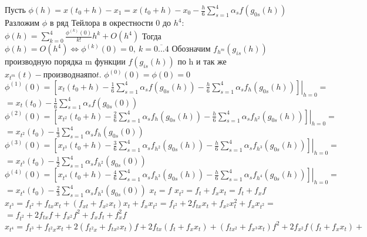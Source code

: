 \documentclass[a4paper,14pt]{article}
\begin{document}
Пусть $\phi(h)=x(t_0+h)-x_{1}=x(t_0+h)-x_0-\frac{h}{6}\sum\limits_{s=1}^{4}\alpha_sf(g_{0s}(h))$\newline
Разложим $\phi$ в ряд Тейлора в окрестности 0 до $h^4$:\newline
$\phi(h)=\sum\limits_{k=0}^{4}\frac{\phi^{(k)}(0)}{k!}h^k+O(h^4)$\newline
Тогда $\phi(h)=O(h^4) \Leftrightarrow \phi^{(k)}(0)=0,\ k=\overline{0...4}$\newline
Обозначим $f_{h^m}(g_{is}(h))$ производную порядка m функции $f(g_{is}(h))$ по h и так же $x_{t^m}(t) - производная по t$.\newline
$\phi^{(0)}(0)=\phi(0)=0$\newline
$\phi^{(1)}(0)=\left.\left[x_t(t_0+h)-\frac{1}{6}\sum\limits_{s=1}^{4}\alpha_sf(g_{0s}(h))-\frac{h}{6}\sum\limits_{s=1}^{4}\alpha_sf_h(g_{0s}(h))\right]\right|_{h=0}=$\newline
$=x_t(t_0)-\frac{1}{6}\sum\limits_{s=1}^{4}\alpha_sf(g_{0s}(0))$\newline
$\phi^{(2)}(0)=\left.\left[x_{t^2}(t_0+h)-\frac{2}{6}\sum\limits_{s=1}^{4}\alpha_sf_{h}(g_{0s}(h))-\frac{h}{6}\sum\limits_{s=1}^{4}\alpha_sf_{h^2}(g_{0s}(h))\right]\right|_{h=0}=$\newline
$=x_{t^2}(t_0)-\frac{1}{3}\sum\limits_{s=1}^{4}\alpha_sf_h(g_{0s}(0))$\newline
$\phi^{(3)}(0)=\left.\left[x_{t^3}(t_0+h)-\frac{3}{6}\sum\limits_{s=1}^{4}\alpha_sf_{h^2}(g_{0s}(h))-\frac{h}{6}\sum\limits_{s=1}^{4}\alpha_sf_{h^3}(g_{0s}(h))\right]\right|_{h=0}=$\newline
$=x_{t^3}(t_0)-\frac{1}{2}\sum\limits_{s=1}^{4}\alpha_sf_{h^2}(g_{0s}(0))$\newline
$\phi^{(4)}(0)=\left.\left[x_{t^4}(t_0+h)-\frac{4}{6}\sum\limits_{s=1}^{4}\alpha_sf_{h^3}(g_{0s}(h))-\frac{h}{6}\sum\limits_{s=1}^{4}\alpha_sf_{h^4}(g_{0s}(h))\right]\right|_{h=0}=$\newline
$=x_{t^4}(t_0)-\frac{2}{3}\sum\limits_{s=1}^{4}\alpha_sf_{h^3}(g_{0s}(0))$\newline
$x_t=f$\newline
$x_{t^2}=f_t+f_xx_t=f_t+f_xf$\newline
$x_{t^3}=f_{t^2}+f_{tx}x_t+(f_{xt}+f_{x^2}x_t)x_t+f_xx_{t^2}=f_{t^2}+2f_{tx}x_t+f_{x^2}x_t^2+f_xx_{t^2}=$\newline
$=f_{t^2}+2f_{tx}f+f_{x^2}f^2+f_xf_t+f_x^2f$\newline
$x_{t^4}=f_{t^3}+f_{t^2x}x_t+2(f_{t^2x}+f_{tx^2}x_t)f+2f_{tx}(f_t+f_xx_t)+(f_{tx^2}+f_{x^3}x_t)f^2+2f_{x^2}f(f_t+f_xx_t)+$\newline
\end{document}
